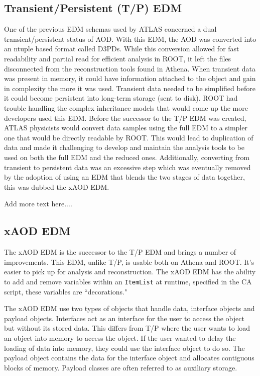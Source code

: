 \subsection{Transient/Persistent (T/P) EDM}
One of the previous EDM schemas used by ATLAS concerned a dual transient/persistent status of AOD.
With this EDM, the AOD was converted into an ntuple based format called D3PDs. 
While this conversion allowed for fast readability and partial read for efficient analysis in ROOT, it left the files disconnected from the reconstruction tools found in Athena.\cite{Athena_xAOD_design}
When transient data was present in memory, it could have information attached to the object and gain in complexity the more it was used.
Transient data needed to be simplified before it could become persistent into long-term storage (sent to disk). 
ROOT had trouble handling the complex inheritance models that would come up the more developers used this EDM. 
Before the successor to the T/P EDM was created, ATLAS physicists would convert data samples using the full EDM to a simpler one that would be directly readable by ROOT.
This would lead to duplication of data and made it challenging to develop and maintain the analysis tools to be used on both the full EDM and the reduced ones.
Additionally, converting from transient to persistent data was an excessive step which was eventually removed by the adoption of using an EDM that blends the two stages of data together, this was dubbed the xAOD EDM.

Add more text here.... \cite{ATLAS_Fact_Sheet}

\subsection{xAOD EDM}
The xAOD EDM is the successor to the T/P EDM and brings a number of improvements.\cite{Buckley_2015}
This EDM, unlike T/P, is usable both on Athena and ROOT.
It's easier to pick up for analysis and reconstruction. 
The xAOD EDM has the ability to add and remove variables within an \verb|ItemList| at runtime, specified in the CA script, these variables are ``decorations."

The xAOD EDM use two types of objects that handle data, interface objects and payload objects. 
Interfaces act as an interface for the user to access the object but without its stored data. 
This differs from T/P where the user wants to load an object into memory to access the object. 
If the user wanted to delay the loading of data into memory, they could use the interface object to do so. 
The payload object contains the data for the interface object and allocates contiguous blocks of memory. 
Payload classes are often referred to as auxiliary storage. 

